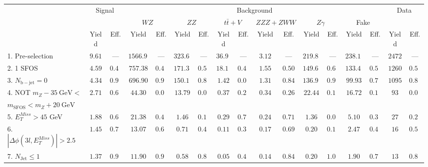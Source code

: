 \begin{tabular}{l||c|c||c|c||c|c||c|c||c|c||c|c||c|c||c|c}
\hline
 &                 \multicolumn{2}{c||}{Signal}            &  \multicolumn{12}{c||}{Background} &  \multicolumn{2}{c}{Data} \\
 & &  & \multicolumn{2}{c||}{$WZ$} & \multicolumn{2}{c||}{$ZZ$} & \multicolumn{2}{c||}{$t\bar{t}+V$} & \multicolumn{2}{c||}{$ZZZ+ZWW$} & \multicolumn{2}{c||}{$Z\gamma$} & \multicolumn{2}{c||}{Fake} &  & \\ 
 & Yield & Eff. & Yield & Eff. & Yield & Eff. & Yield & Eff. & Yield & Eff. & Yield & Eff. & Yield & Eff. & Yield & Eff.\\
\hline\hline
1. Pre-selection &  $9.61$ & --- &  $1566.91$ & --- &  $323.60$ & --- &  $36.93$ & --- &  $3.12$ & --- &  $219.80$ & --- &  $238.12$ & ---  & $2472$ &  --- \\
\hline
2. 1 SFOS &  $4.59$ &  $0.48$ &  $757.38$ &  $0.48$ &  $171.39$ &  $0.53$ &  $18.10$ &  $0.49$ &  $1.55$ &  $0.50$ &  $149.60$ &  $0.68$ &  $133.47$ &  $0.56$ & $1260$ &  $0.51$\\ 
\hline
3. $N_{\mathrm{b-jet}} = 0$ &  $4.34$ &  $0.94$ &  $696.90$ &  $0.92$ &  $150.14$ &  $0.88$ &  $1.42$ &  $0.08$ &  $1.31$ &  $0.84$ &  $136.96$ &  $0.92$ &  $99.93$ &  $0.75$ & $1095$ &  $0.87$\\ 
\hline
4. NOT $m_Z - 35~\mathrm{GeV} <$  &  \multirow{2}{*}{$2.71$} &  \multirow{2}{*}{$0.63$} &  \multirow{2}{*}{$44.30$} &  \multirow{2}{*}{$0.06$} &  \multirow{2}{*}{$13.79$} &  \multirow{2}{*}{$0.09$} &  \multirow{2}{*}{$0.37$} &  \multirow{2}{*}{$0.26$} &  \multirow{2}{*}{$0.34$} &  \multirow{2}{*}{$0.26$} &  \multirow{2}{*}{$22.44$} &  \multirow{2}{*}{$0.16$} &  \multirow{2}{*}{$16.72$} &  \multirow{2}{*}{$0.17$} & \multirow{2}{*}{$93$} &  \multirow{2}{*}{$0.08$}\\ 
$ m_{\mathrm{SFOS}} < m_Z + 20~\mathrm{GeV}$  & & & & & & & & & & & & & &  & \\
\hline
5. $E_{T}^{Miss} > 45$ GeV &  $1.88$ &  $0.69$ &  $21.38$ &  $0.48$ &  $1.46$ &  $0.11$ &  $0.29$ &  $0.78$ &  $0.24$ &  $0.71$ &  $1.36$ &  $0.06$ &  $5.10$ &  $0.31$ & $27$ &  $0.29$\\ 
\hline
6. $|\Delta\phi(3l,E_{T}^{Miss})| > 2.5$ &  $1.45$ &  $0.77$ &  $13.07$ &  $0.61$ &  $0.71$ &  $0.49$ &  $0.11$ &  $0.39$ &  $0.17$ &  $0.69$ &  $0.20$ &  $0.15$ &  $2.47$ &  $0.48$ & $16$ &  $0.59$\\ 
\hline
7. $N_{\mathrm{Jet}} \leq 1$ &  $1.37$ &  $0.94$ &  $11.90$ &  $0.91$ &  $0.58$ &  $0.82$ &  $0.05$ &  $0.45$ &  $0.14$ &  $0.84$ &  $0.20$ &  $1.00$ &  $1.90$ &  $0.77$ & $13$ &  $0.81$\\ 
\hline
\end{tabular}
